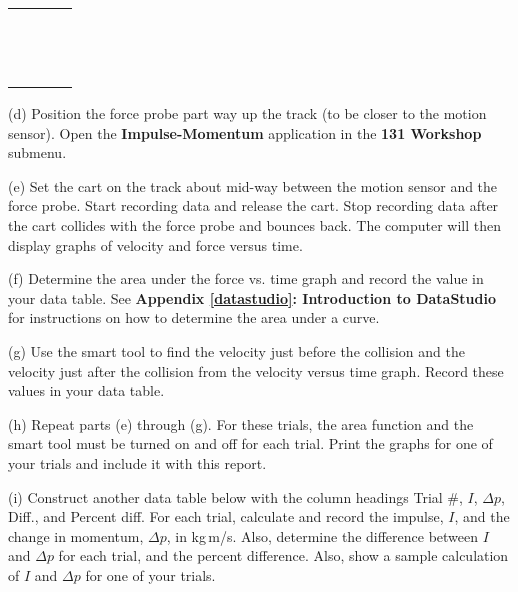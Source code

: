 \begin{center}
\begin{tabular}{|p{1.0in}|p{1.0in}|p{1.0in}|p{1.0in}|} \hline
 & & & \\ \hline
 & & & \\
 & & & \\
 & & & \\
 & & & \\
 & & & \\
 & & & \\
 & & & \\
 & & & \\
 & & & \\
 & & & \\
 & & & \\
 & & & \\
 & & & \\ \hline
\end{tabular}
\end{center}

(d) Position the force probe part way up the track (to be closer to the motion sensor). Open the \textbf{Impulse-Momentum} application in the \textbf{131 Workshop} submenu. 

(e) Set the cart on the track about mid-way between the motion sensor and the force probe. Start recording data and release the cart. Stop recording data after the cart collides with the force probe and bounces back. The computer will then display graphs of velocity and force versus time.

(f) Determine the area under the force vs. time graph and record the value in
your data table. See \textbf{Appendix \ref{datastudio}: Introduction to DataStudio} for instructions on how to determine the area under a curve.

(g) Use the smart tool to find the velocity just before the collision and the
velocity just after the collision from the velocity versus time graph. Record
these values in your data table.

(h) Repeat parts (e) through (g). For these trials, 
the area function and the smart tool must be turned on and off for each trial. 
Print the graphs for one of your trials and include it with this report.

\newpage

(i) Construct another data table below with the column headings
Trial \#, $I$, \( \Delta  p\), Diff., and Percent diff. For each trial, calculate and record
the impulse, $I$, and the change in momentum, \( \Delta  p\), in kg\,m/s. Also,
determine the difference between $I$ and $\Delta p$  for each trial, and the percent difference. Also, show a sample
calculation of $I$ and \( \Delta  p\) for one of your trials.

